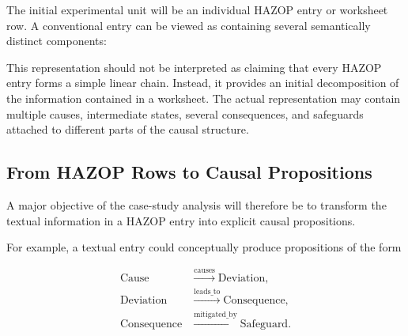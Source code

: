 The initial experimental unit will be an individual HAZOP entry or
worksheet row. A conventional entry can be viewed as containing
several semantically distinct components:

\begin{center}
\end{center}

This representation should not be interpreted as claiming that every
HAZOP entry forms a simple linear chain. Instead, it provides an
initial decomposition of the information contained in a worksheet.
The actual representation may contain multiple causes, intermediate
states, several consequences, and safeguards attached to different
parts of the causal structure.

\subsection{From HAZOP Rows to Causal Propositions}

A major objective of the case-study analysis will therefore be to
transform the textual information in a HAZOP entry into explicit
causal propositions.

For example, a textual entry could conceptually produce propositions
of the form

\begin{align}
\text{Cause} &\xrightarrow{\text{causes}} \text{Deviation},\\
\text{Deviation} &\xrightarrow{\text{leads\_to}} \text{Consequence},\\
\text{Consequence} &\xrightarrow{\text{mitigated\_by}} \text{Safeguard}.
\end{align}

